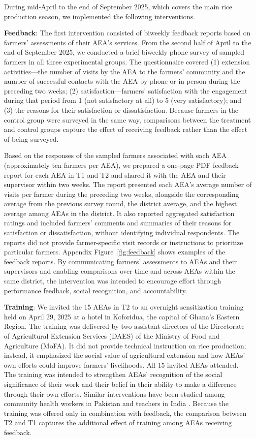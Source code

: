 \documentclass[11pt]{article}
\begin{document}
During mid-April to the end of September 2025, which covers the main rice production season, we implemented the following interventions.
 
\textbf{Feedback}: The first intervention consisted of biweekly feedback reports based on farmers' assessments of their AEA's services. From the second half of April to the end of September 2025, we conducted a brief biweekly phone survey of sampled farmers in all three experimental groups. The questionnaire covered (1) extension activities---the number of visits by the AEA to the farmers' community and the number of successful contacts with the AEA by phone or in person during the preceding two weeks; (2) satisfaction---farmers' satisfaction with the engagement during that period from 1 (not satisfactory at all) to 5 (very satisfactory); and (3) the reasons for their satisfaction or dissatisfaction. Because farmers in the control group were surveyed in the same way, comparisons between the treatment and control groups capture the effect of receiving feedback rather than the effect of being surveyed.
 
Based on the responses of the sampled farmers associated with each AEA (approximately ten farmers per AEA), we prepared a one-page PDF feedback report for each AEA in T1 and T2 and shared it with the AEA and their supervisor within two weeks. The report presented each AEA's average number of visits per farmer during the preceding two weeks, alongside the corresponding average from the previous survey round, the district average, and the highest average among AEAs in the district. It also reported aggregated satisfaction ratings and included farmers' comments and summaries of their reasons for satisfaction or dissatisfaction, without identifying individual respondents. The reports did not provide farmer-specific visit records or instructions to prioritize particular farmers. Appendix Figure~\ref{fig:feedback} shows examples of the feedback reports. By communicating farmers' assessments to AEAs and their supervisors and enabling comparisons over time and across AEAs within the same district, the intervention was intended to encourage effort through performance feedback, social recognition, and accountability.
 
\textbf{Training}: We invited the 15 AEAs in T2 to an overnight sensitization training held on April 29, 2025 at a hotel in Koforidua, the capital of Ghana's Eastern Region. The training was delivered by two assistant directors of the Directorate of Agricultural Extension Services (DAES) of the Ministry of Food and Agriculture (MoFA). It did not provide technical instruction on rice production; instead, it emphasized the social value of agricultural extension and how AEAs' own efforts could improve farmers' livelihoods. All 15 invited AEAs attended. The training was intended to strengthen AEAs' recognition of the social significance of their work and their belief in their ability to make a difference through their own efforts. Similar interventions have been studied among community health workers in Pakistan \citep{Khan2025} and teachers in India \citep{Kaur2023}. Because the training was offered only in combination with feedback, the comparison between T2 and T1 captures the additional effect of training among AEAs receiving feedback.
 
\end{document}
